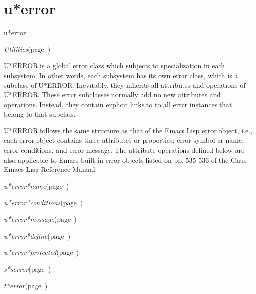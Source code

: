 \section{u*error}
\label{u*error}

\begin{description}
\item [Name:]  u*error

\item [Layer:] {\sl Utilities}\hfill(page~\pageref{Utilities})

\item [Description:]
U*ERROR is a global error class which subjects to specialization in
each subsystem. In other words, each subsystem has its own error
class, which is a subclass of U*ERROR. Inevitably, they inherits all
attributes and operations of U*ERROR. These error subclasses normally
add no new attributes and operations. Instead, they contain explicit
links to to all error instances that belong to that subclass.

U*ERROR follows the same structure as that of the Emacs Lisp error
object, i.e., each error object contains three attributes or
properties: error symbol or name, error conditions, and error message.
The attribute operations defined below are also applicable to Emacs
built-in error objects listed on pp. 535-536 of the Gnus Emacs Lisp
Reference Manual

\item [Attributes:]
\item {\sl u*error*name}\hfill(page~\pageref{u*error*name})
\item {\sl u*error*conditions}\hfill(page~\pageref{u*error*conditions})
\item {\sl u*error*message}\hfill(page~\pageref{u*error*message})

\item [Operations:]
\item {\sl u*error*define}\hfill(page~\pageref{u*error*define})
\item {\sl u*error*protected}\hfill(page~\pageref{u*error*protected})

\item [Collections:]

\item [Subclasses:]
\item {\sl s*serror}\hfill(page~\pageref{s*serror})
\item {\sl t*error}\hfill(page~\pageref{t*error})

\item [Superclasses:]




\end{description}
\horizontalline

